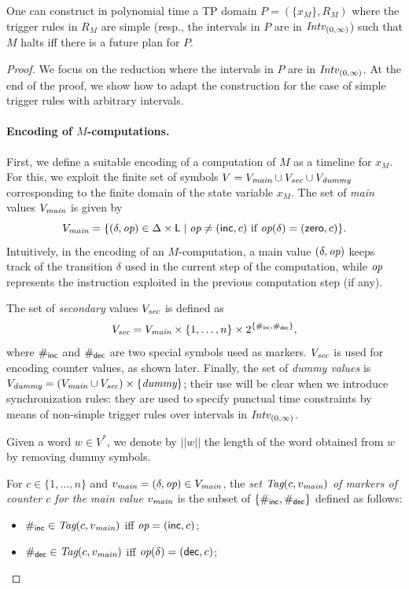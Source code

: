 \begin{proposition}\label{prop:NPRHardness}
One can construct in polynomial time a TP domain $P=(\{x_M\},R_M)$ where the trigger rules in $R_M$ are simple (resp., the intervals in $P$ are in ${\mathit{Intv}}_{(0,\infty)}$)
such that $M$ halts iff there is a future plan for $P$.
\end{proposition}
\begin{proof}
We focus on the reduction where the intervals in $P$ are in ${\mathit{Intv}}_{(0,\infty)}$. At the end of the proof, we show how to adapt the construction for %
the case of simple trigger rules with arbitrary intervals.

\paragraph*{Encoding of $M$-computations.}
First, we define a suitable encoding of a computation of $M$ as a timeline for $x_M$. For this,
we exploit the finite set of symbols $V= V_{{\textit{main}}}\cup V_{{\textit{sec}}}\cup V_{{\textit{dummy}}}$ corresponding to the finite domain of the state variable $x_M$.
The   set of \emph{main} values $V_{{\textit{main}}}$ is given by
%
\[
V_{\textit{main}} = \{(\delta,{\textit{op}})\in\Delta\times\mathsf{L}\mid {\textit{op}}\neq ({\mathsf{inc}},c) \text{ if }{\textit{op}}(\delta)=({\mathsf{zero}},c)\}.
\]
Intuitively, in the encoding of an $M$-computation, a main value $(\delta,{\textit{op}})$ keeps track of the transition $\delta$ used in the current step of the computation, while
${\textit{op}}$ represents the instruction exploited in the previous computation step (if any).

The set of \emph{secondary} values $V_{{\textit{sec}}}$ is defined as
%
\[
 V_{\textit{sec}} = V_{\textit{main}} \times \{1,\ldots,n\} \times 2^{\{\#_{\mathsf{inc}},\#_{\mathsf{dec}}\}},
\]
where $\#_{\mathsf{inc}}$ and $\#_{\mathsf{dec}}$
are two special symbols used as markers. $V_{{\textit{sec}}}$ is used for encoding counter values, as shown later.
%
Finally, the set of \emph{dummy values} is $V_{{\textit{dummy}}}=(V_{{\textit{main}}}\cup V_{{\textit{sec}}})\times \{{\textit{dummy}}\}$;
their use will be clear when we introduce synchronization rules:
they are used to specify punctual time constraints by means of
non-simple trigger rules over intervals in
${\mathit{Intv}}_{(0,\infty)}$. 

Given a word $w\in V^{*}$, we denote by $||w||$ the length of the word
obtained from $w$ by removing dummy symbols.

 For $c\in \{1,\ldots,n\}$ and $v_{\textit{main}} = (\delta,{\textit{op}})\in V_{\textit{main}}$,
the \emph{set ${\textit{Tag}}(c,v_{\textit{main}})$ of markers of counter $c$ for the main value $v_{\textit{main}}$} is the subset of  $\{\#_{\mathsf{inc}},\#_{\mathsf{dec}}\}$ defined as follows:
\begin{itemize}
  \item $\#_{\mathsf{inc}}\in {\textit{Tag}}(c,v_{\textit{main}})$ iff ${\textit{op}} = ({\mathsf{inc}},c)$;
  \item $\#_{\mathsf{dec}}\in {\textit{Tag}}(c,v_{\textit{main}})$ iff ${\textit{op}}(\delta) = ({\mathsf{dec}},c)$;
\end{itemize}


\end{proof}
